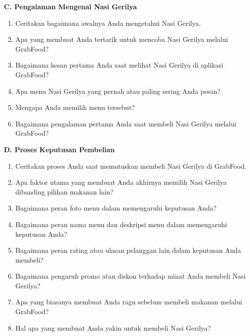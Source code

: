 \documentclass[10pt,a4paper]{article}
\newcommand{\sectionbar}[1]{%
  \Needspace{5\baselineskip}
  \vspace{4mm}
  \noindent\colorbox{Soft}{%
    \parbox{\dimexpr\linewidth-2\fboxsep\relax}{%
      \large\bfseries\textcolor{Primary}{#1}
    }%
  }\par\vspace{1mm}
}
\newcommand{\probe}[1]{%
  \vspace{1mm}
  \noindent{\small\textbf{\textcolor{Accent}{Probing:}} \textcolor{TextGray}{#1}}\par
}
\begin{document}
\sectionbar{C. Pengalaman Mengenal Nasi Gerilya}
\begin{enumerate}[label=\arabic*.,leftmargin=*,itemsep=1.2mm,resume]
\item Ceritakan bagaimana awalnya Anda mengetahui Nasi Gerilya.
\item Apa yang membuat Anda tertarik untuk mencoba Nasi Gerilya melalui GrabFood?
\item Bagaimana kesan pertama Anda saat melihat Nasi Gerilya di aplikasi GrabFood?
\item Apa menu Nasi Gerilya yang pernah atau paling sering Anda pesan?
\item Mengapa Anda memilih menu tersebut?
\item Bagaimana pengalaman pertama Anda saat membeli Nasi Gerilya melalui GrabFood?
\end{enumerate}
\probe{Gali sumber informasi pertama, alasan mencoba, dan kesan awal terhadap tampilan toko di aplikasi.}

\sectionbar{D. Proses Keputusan Pembelian}
\begin{enumerate}[label=\arabic*.,leftmargin=*,itemsep=1.2mm,resume]
\item Ceritakan proses Anda saat memutuskan membeli Nasi Gerilya di GrabFood.
\item Apa faktor utama yang membuat Anda akhirnya memilih Nasi Gerilya dibanding pilihan makanan lain?
\item Bagaimana peran foto menu dalam memengaruhi keputusan Anda?
\item Bagaimana peran nama menu dan deskripsi menu dalam memengaruhi keputusan Anda?
\item Bagaimana peran rating atau ulasan pelanggan lain dalam keputusan Anda membeli?
\item Bagaimana pengaruh promo atau diskon terhadap minat Anda membeli Nasi Gerilya?
\item Apa yang biasanya membuat Anda ragu sebelum membeli makanan melalui GrabFood?
\item Hal apa yang membuat Anda yakin untuk membeli Nasi Gerilya?
\end{enumerate}
\probe{Minta informan mengurutkan faktor keputusan dari yang paling berpengaruh sampai yang paling kecil.}
\end{document}
